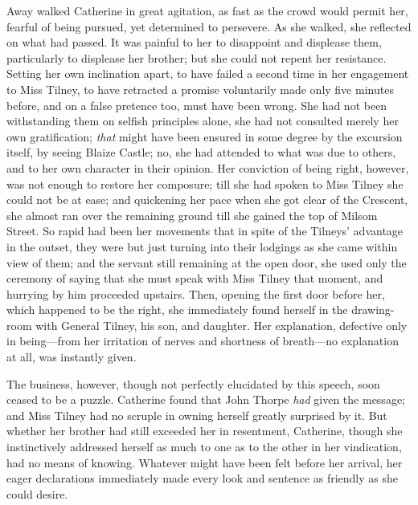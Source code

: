 Away walked Catherine in great agitation, as fast as the crowd would permit her, fearful of being pursued, yet determined to persevere. As she walked, she reflected on what had passed. It was painful to her to disappoint and displease them, particularly to displease her brother; but she could not repent her resistance. Setting her own inclination apart, to have failed a second time in her engagement to Miss Tilney, to have retracted a promise voluntarily made only five minutes before, and on a false pretence too, must have been wrong. She had not been withstanding them on selfish principles alone, she had not consulted merely her own gratification; {\em that} might have been ensured in some degree by the excursion itself, by seeing Blaize Castle; no, she had attended to what was due to others, and to her own character in their opinion. Her conviction of being right, however, was not enough to restore her composure; till she had spoken to Miss Tilney she could not be at ease; and quickening her pace when she got clear of the Crescent, she almost ran over the remaining ground till she gained the top of Milsom Street. So rapid had been her movements that in spite of the Tilneys' advantage in the outset, they were but just turning into their lodgings as she came within view of them; and the servant still remaining at the open door, she used only the ceremony of saying that she must speak with Miss Tilney that moment, and hurrying by him proceeded upstairs. Then, opening the first door before her, which happened to be the right, she immediately found herself in the drawing-room with General Tilney, his son, and daughter. Her explanation, defective only in being---from her irritation of nerves and shortness of breath---no explanation at all, was instantly given. 

The business, however, though not perfectly elucidated by this speech, soon ceased to be a puzzle. Catherine found that John Thorpe {\em had} given the message; and Miss Tilney had no scruple in owning herself greatly surprised by it. But whether her brother had still exceeded her in resentment, Catherine, though she instinctively addressed herself as much to one as to the other in her vindication, had no means of knowing. Whatever might have been felt before her arrival, her eager declarations immediately made every look and sentence as friendly as she could desire.


